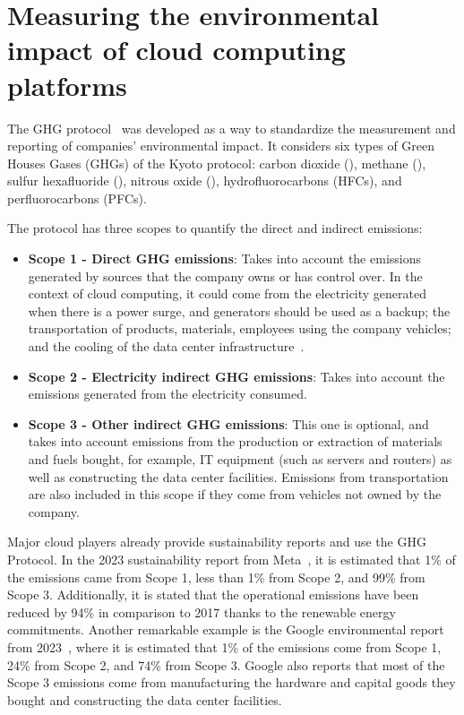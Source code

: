 \section{Measuring the environmental impact of cloud computing platforms}

\label{sec:measuring_environmental_impact}


The GHG protocol~\cite{ghgprotocol2004} was developed as a way to standardize the measurement and reporting of companies' environmental impact. It considers six types of Green Houses Gases (GHGs) of the Kyoto protocol: carbon dioxide (), methane (), sulfur hexafluoride (), nitrous oxide (), hydrofluorocarbons (HFCs), and perfluorocarbons (PFCs).


The protocol has three scopes to quantify the direct and indirect emissions:

\begin{itemize}
\item \textbf{Scope 1 - Direct GHG emissions}: Takes into account the emissions generated by sources that the company owns or has control over. In the context of cloud computing, it could come from the electricity generated when there is a power surge, and generators should be used as a backup; the transportation of products, materials, employees using the company vehicles; and the cooling of the data center infrastructure~\cite{gupta2021_chasingcarbon}.
\item \textbf{Scope 2 - Electricity indirect GHG emissions}: Takes into account the emissions generated from the electricity consumed.
\item \textbf{Scope 3 - Other indirect GHG emissions}: This one is optional, and takes into account emissions from the production or extraction of materials and fuels bought, for example, IT equipment (such as servers and routers) as well as constructing the data center facilities. Emissions from transportation are also included in this scope if they come from vehicles not owned by the company.
\end{itemize}  

Major cloud players already provide sustainability reports and use the GHG Protocol. In the 2023 sustainability report from Meta~\cite{meta_sustainability_report_2023}, it is estimated that 1\% of the emissions came from Scope 1, less than 1\% from Scope 2, and 99\% from Scope 3. Additionally, it is stated that the operational emissions have been reduced by 94\% in comparison to 2017 thanks to the renewable energy commitments. Another remarkable example is the Google environmental report from 2023~\cite{google_sustainability_report_2023}, where it is estimated that 1\% of the emissions come from Scope 1, 24\% from Scope 2, and 74\% from Scope 3. Google also reports that most of the Scope 3 emissions come from manufacturing the hardware and capital goods they bought and constructing the data center facilities.

